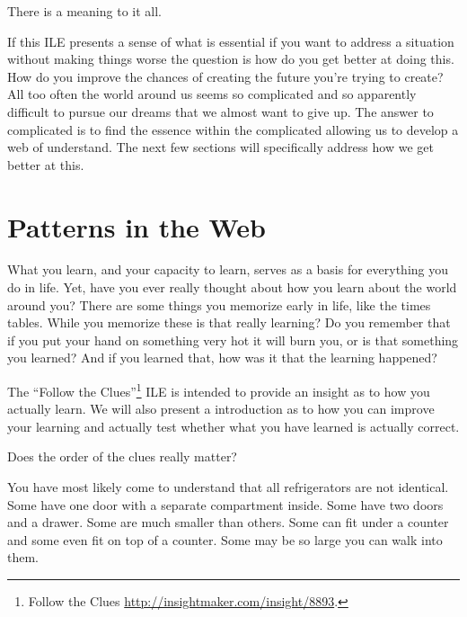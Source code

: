 \documentclass[]{memoir}
\begin{document}
\FloatBarrier 

\begin{model}[frametitle={Model: Creating the Future}] 

 There is a meaning to it all.




 \end{model}

If this ILE presents a sense of what is essential if you want to address
a situation without making things worse the question is how do you get
better at doing this. How do you improve the chances of creating the
future you're trying to create? All too often the world around us seems
so complicated and so apparently difficult to pursue our dreams that we
almost want to give up. The answer to complicated is to find the essence
within the complicated allowing us to develop a web of understand. The
next few sections will specifically address how we get better at this.

\section{Patterns in the Web}

What you learn, and your capacity to learn, serves as a basis for
everything you do in life. Yet, have you ever really thought about how
you learn about the world around you? There are some things you memorize
early in life, like the times tables. While you memorize these is that
really learning? Do you remember that if you put your hand on something
very hot it will burn you, or is that something you learned? And if you
learned that, how was it that the learning happened?

The ``Follow the Clues''\footnote{Follow the Clues
  \url{http://insightmaker.com/insight/8893}.} ILE is intended to
provide an insight as to how you actually learn. We will also present a
introduction as to how you can improve your learning and actually test
whether what you have learned is actually correct.

\FloatBarrier 

\begin{model}[frametitle={Model: Follow the clues}] 

 Does the order of the clues really matter?




 \end{model}

You have most likely come to understand that all refrigerators are not
identical. Some have one door with a separate compartment inside. Some
have two doors and a drawer. Some are much smaller than others. Some can
fit under a counter and some even fit on top of a counter. Some may be
so large you can walk into them.
\end{document}
